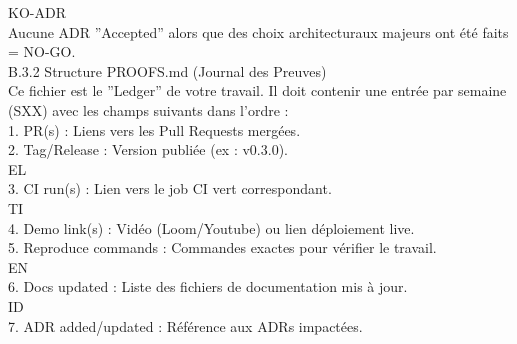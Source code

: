 \vspace{0.5em}
\vspace{0.5em}
\vspace{0.5em}
KO-ADR\\
Aucune ADR ”Accepted” alors que des choix architecturaux majeurs ont été faits = NO-GO.\\
\vspace{0.5em}
\vspace{0.5em}
B.3.2 Structure PROOFS.md (Journal des Preuves)\\
Ce fichier est le ”Ledger” de votre travail. Il doit contenir une entrée par semaine (SXX) avec les champs suivants dans l’ordre :\\
\vspace{0.5em}
1. PR(s) : Liens vers les Pull Requests mergées.\\
\vspace{0.5em}
2. Tag/Release : Version publiée (ex : v0.3.0).\\
\vspace{0.5em}
\vspace{0.5em}
\vspace{0.5em}
\vspace{0.5em}
EL\\
3. CI run(s) : Lien vers le job CI vert correspondant.\\
\vspace{0.5em}
\vspace{0.5em}
\vspace{0.5em}
\vspace{0.5em}
TI\\
4. Demo link(s) : Vidéo (Loom/Youtube) ou lien déploiement live.\\
\vspace{0.5em}
5. Reproduce commands : Commandes exactes pour vérifier le travail.\\
\vspace{0.5em}
\vspace{0.5em}
\vspace{0.5em}
\vspace{0.5em}
EN\\
6. Docs updated : Liste des fichiers de documentation mis à jour.\\
\vspace{0.5em}
\vspace{0.5em}
\vspace{0.5em}
\vspace{0.5em}
ID\\
7. ADR added/updated : Référence aux ADRs impactées.\\
